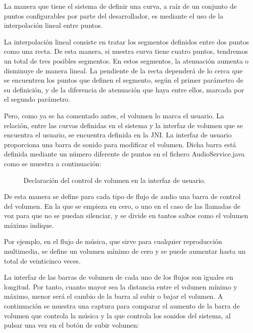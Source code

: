 La manera que tiene el sistema de definir una curva, a raíz de un conjunto de puntos configurables por parte del desarrollador, es mediante el uso de la interpolación lineal entre puntos.

La interpolación lineal consiste en tratar los segmentos definidos entre dos puntos como una recta. De esta manera, si nuestra curva tiene cuatro puntos, tendremos un total de tres posibles segmentos. En estos segmentos, la atenuación aumenta o disminuye de manera lineal. La pendiente de la recta dependerá de lo cerca que se encuentren los puntos que definen el segmento, según el primer parámetro de su definición, y de la diferencia de atenuación que haya entre ellos, marcada por el segundo parámetro.

Pero, como ya se ha comentado antes, el volumen lo marca el usuario. La relación, entre las curvas definidas en el sistema y la interfaz de volumen que se encuentra el usuario, se encuentra definida en la \gls{JNI}. La interfaz de usuario proporciona una barra de sonido para modificar el volumen. Dicha barra está definida mediante un número diferente de puntos en el fichero AudioService.java como se muestra a continuación:

\begin{figure}[H]
	\centering
	\caption{Declaración del control de volumen en la interfaz de usuario.} \label{fig:volume_curves_ui}
\end{figure}

De esta manera se define para cada tipo de flujo de audio una barra de control del volumen. En la que se empieza en cero, o uno en el caso de las llamadas de voz para que no se puedan silenciar, y se divide en tantos saltos como el volumen máximo indique.

Por ejemplo, en el flujo de música, que sirve para cualquier reproducción multimedia, se define un volumen mínimo de cero y se puede aumentar hasta un total de veinticinco veces.

La interfaz de las barras de volumen de cada uno de los flujos son iguales en longitud. Por tanto, cuanto mayor sea la distancia entre el volumen mínimo y máximo, menor será el cambio de la barra al subir o bajar el volumen. A continuación se muestra una captura para comparar el aumento de la barra de volumen que controla la música y la que controla los sonidos del sistema, al pulsar una vez en el botón de subir volumen:

